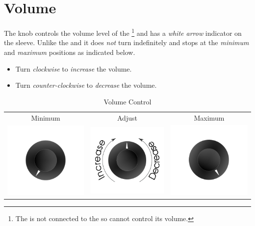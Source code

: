\section{Volume} \label{Audio - Volume}

The  knob controls the volume level of the \footnote{ The
 is not connected to the  so cannot control its volume.}
and has a \textit{white arrow} indicator on the sleeve.  Unlike the  and
 it does \textit{not} turn indefinitely and stops at the
\textit{minimum} and \textit{maximum} positions as indicated below.

\begin{itemize}
  \item Turn \textit{clockwise} to \textit{increase} the volume.
  \item Turn \textit{counter-clockwise} to \textit{decrease} the volume.
\end{itemize}

\begin{table}[H]
\centering
\begin{tabular}{ c c c }
  Minimum & Adjust & Maximum \\
  \includegraphics{images/volume_lo.png}
    & \includegraphics{images/volume.png}
    & \includegraphics{images/volume_hi.png}
\end{tabular}
\caption{Volume Control}
\end{table}

